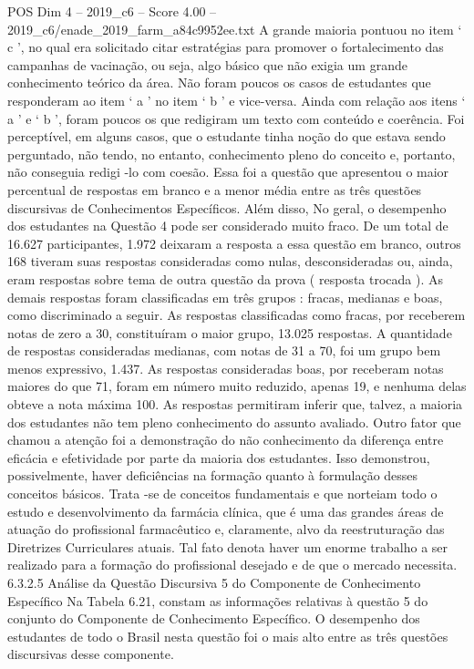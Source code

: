 \begin{textsample}{POS Dim 4 – 2019\_c6 – Score 4.00 – 2019\_c6/enade\_2019\_farm\_a84c9952ee.txt}
A grande maioria pontuou no item ‘ c ’, no qual era solicitado citar estratégias para promover o fortalecimento das campanhas de vacinação, ou seja, algo básico que não exigia um grande conhecimento teórico da área.
Não foram poucos os casos de estudantes que responderam ao item ‘ a ’ no item ‘ b ’ e vice-versa.
Ainda com relação aos itens ‘ a ’ e ‘ b ’, foram poucos os que redigiram um texto com conteúdo e coerência.
Foi perceptível, em alguns casos, que o estudante tinha noção do que estava sendo perguntado, não tendo, no entanto, conhecimento pleno do conceito e, portanto, não conseguia redigi -lo com coesão.
Essa foi a questão que apresentou o maior percentual de respostas em branco e a menor média entre as três questões discursivas de Conhecimentos Específicos.
Além disso, No geral, o desempenho dos estudantes na Questão 4 pode ser considerado muito fraco.
De um total de 16.627 participantes, 1.972 deixaram a resposta a essa questão em branco, outros 168 tiveram suas respostas consideradas como nulas, desconsideradas ou, ainda, eram respostas sobre tema de outra questão da prova ( resposta trocada ).
As demais respostas foram classificadas em três grupos : fracas, medianas e boas, como discriminado a seguir.
As respostas classificadas como fracas, por receberem notas de zero a 30, constituíram o maior grupo, 13.025 respostas.
A quantidade de respostas consideradas medianas, com notas de 31 a 70, foi um grupo bem menos expressivo, 1.437.
As respostas consideradas boas, por receberam notas maiores do que 71, foram em número muito reduzido, apenas 19, e nenhuma delas obteve a nota máxima 100.
As respostas permitiram inferir que, talvez, a maioria dos estudantes não tem pleno conhecimento do assunto avaliado.
Outro fator que chamou a atenção foi a demonstração do não conhecimento da diferença entre eficácia e efetividade por parte da maioria dos estudantes.
Isso demonstrou, possivelmente, haver deficiências na formação quanto à formulação desses conceitos básicos.
Trata -se de conceitos fundamentais e que norteiam todo o estudo e desenvolvimento da farmácia clínica, que é uma das grandes áreas de atuação do profissional farmacêutico e, claramente, alvo da reestruturação das Diretrizes Curriculares atuais.
Tal fato denota haver um enorme trabalho a ser realizado para a formação do profissional desejado e de que o mercado necessita. 6.3.2.5 Análise da Questão Discursiva 5 do Componente de Conhecimento Específico Na Tabela 6.21, constam as informações relativas à questão 5 do conjunto do Componente de Conhecimento Específico.
O desempenho dos estudantes de todo o Brasil nesta questão foi o mais alto entre as três questões discursivas desse componente.

\end{textsample}
